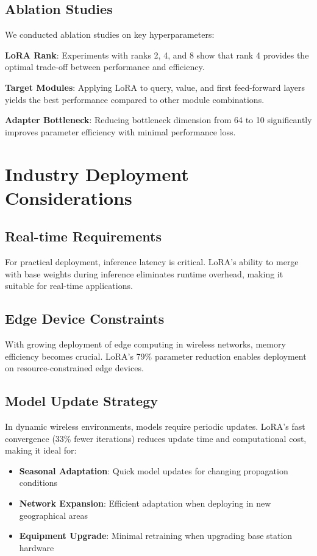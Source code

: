 \documentclass[conference]{IEEEtran}
\begin{document}
\subsection{Ablation Studies}

We conducted ablation studies on key hyperparameters:

\textbf{LoRA Rank}: Experiments with ranks 2, 4, and 8 show that rank 4 provides the optimal trade-off between performance and efficiency.

\textbf{Target Modules}: Applying LoRA to query, value, and first feed-forward layers yields the best performance compared to other module combinations.

\textbf{Adapter Bottleneck}: Reducing bottleneck dimension from 64 to 10 significantly improves parameter efficiency with minimal performance loss.

\section{Industry Deployment Considerations}

\subsection{Real-time Requirements}

For practical deployment, inference latency is critical. LoRA's ability to merge with base weights during inference eliminates runtime overhead, making it suitable for real-time applications.

\subsection{Edge Device Constraints}

With growing deployment of edge computing in wireless networks, memory efficiency becomes crucial. LoRA's 79\% parameter reduction enables deployment on resource-constrained edge devices.

\subsection{Model Update Strategy}

In dynamic wireless environments, models require periodic updates. LoRA's fast convergence (33\% fewer iterations) reduces update time and computational cost, making it ideal for:

\begin{itemize}
\item \textbf{Seasonal Adaptation}: Quick model updates for changing propagation conditions
\item \textbf{Network Expansion}: Efficient adaptation when deploying in new geographical areas  
\item \textbf{Equipment Upgrade}: Minimal retraining when upgrading base station hardware
\end{itemize}
\end{document}
